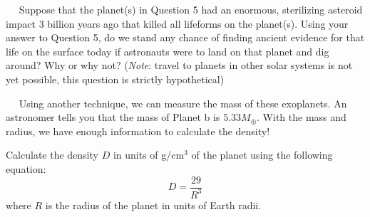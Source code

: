 \documentclass[12pt]{article}
\newcommand{\question}[1]{\vspace{10mm} \noindent {\bf #1)}~~}
\begin{document}
\question{6} Suppose that the planet(s) in Question 5 had an enormous, sterilizing asteroid impact 3 billion years ago that killed all lifeforms on the planet(s). Using your answer to Question 5, do we stand any chance of finding ancient evidence for that life on the surface today if astronauts were to land on that planet and dig around? Why or why not? ({\it Note}: travel to planets in other solar systems is not yet possible, this question is strictly hypothetical)
\vspace{6 cm}

\question{7} Using another technique, we can measure the mass of these exoplanets. An astronomer tells you that the mass of Planet b is $5.33 M_\oplus$. With the mass and radius, we have enough information to calculate the density! 

Calculate the density $D$ in units of g/cm$^3$ of the planet using the following equation: 
\begin{equation}
D = \frac{29}{R^3}
\end{equation}
where $R$ is the radius of the planet in units of Earth radii.
\end{document}
